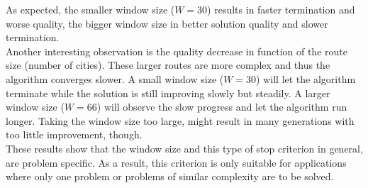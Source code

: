 As expected, the smaller window size ($W = 30$) results in faster termination and worse quality, the bigger window size in better solution quality and slower termination. \\
Another interesting observation is the quality decrease in function of the route size (number of cities). These larger routes are more complex and thus the algorithm converges slower. A small window size ($W = 30$) will let the algorithm terminate while the solution is still improving slowly but steadily. A larger window size ($W = 66$) will observe the slow progress and let the algorithm run longer. Taking the window size too large, might result in many generations with too little improvement, though.\\
\newline
These results show that the window size and this type of stop criterion in general, are problem specific. As a result, this criterion is only suitable for applications where only one problem or problems of similar complexity are to be solved.


